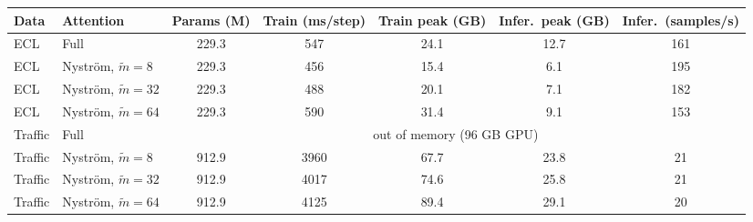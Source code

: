 \begin{tabular}{llccccc}
\toprule
Data & Attention & Params (M) & Train (ms/step) & Train peak (GB) & Infer.\ peak (GB) & Infer.\ (samples/s) \\
\midrule
ECL & Full & 229.3 & 547 & 24.1 & 12.7 & 161 \\
ECL & Nystr\"om, $\tilde m{=}8$ & 229.3 & 456 & 15.4 & 6.1 & 195 \\
ECL & Nystr\"om, $\tilde m{=}32$ & 229.3 & 488 & 20.1 & 7.1 & 182 \\
ECL & Nystr\"om, $\tilde m{=}64$ & 229.3 & 590 & 31.4 & 9.1 & 153 \\
\midrule
Traffic & Full & \multicolumn{5}{c}{out of memory (96 GB GPU)} \\
Traffic & Nystr\"om, $\tilde m{=}8$ & 912.9 & 3960 & 67.7 & 23.8 & 21 \\
Traffic & Nystr\"om, $\tilde m{=}32$ & 912.9 & 4017 & 74.6 & 25.8 & 21 \\
Traffic & Nystr\"om, $\tilde m{=}64$ & 912.9 & 4125 & 89.4 & 29.1 & 20 \\
\bottomrule
\end{tabular}
